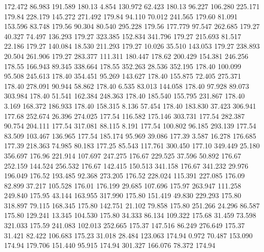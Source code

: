  172.472   86.983  191.589       180.13
   4.854  130.972   62.423       180.13
  96.227  106.280  225.171       179.84
 228.179  145.272  271.492       179.84
  94.110   70.012  241.565       179.60
  81.091  153.596   83.748       179.56
  90.304   80.540  295.228       179.56
 177.779   97.547  262.685       179.27
  40.327   74.497  136.293       179.27
 323.385  152.834  341.796       179.27
 215.693   81.517   22.186       179.27
 140.084   18.530  211.293       179.27
  10.026   35.510  143.053       179.27
 238.893   20.504  261.906       179.27
 283.377  111.311  180.447       178.62
 200.429  154.381  246.256       178.55
 166.943   89.345  338.664       178.55
 352.263   28.536  352.195       178.40
 100.099   95.508  245.613       178.40
 354.451   95.269  143.627       178.40
 155.875   72.405  275.371       178.40
 278.091   90.944   58.862       178.40
   6.535   83.013  144.058       178.40
  97.928   89.073  303.984       178.40
  51.541  162.384  248.363       178.40
 185.540  155.795  231.867       178.40
   3.169  168.372  186.933       178.40
 158.315    8.136   57.454       178.40
 183.830   37.423  306.941       177.68
 252.674   26.396  274.025       177.54
 116.582  175.146  303.731       177.54
 282.387   90.754  204.111       177.54
 317.081   88.115    8.191       177.54
 100.802   96.185  293.139       177.54
  83.509  103.467  136.965       177.54
 185.174   95.969   39.086       177.39
   3.587   16.278  176.685       177.39
 218.363   74.985   80.183       177.25
  85.543  117.761  300.450       177.10
 349.449   25.180  356.697       176.96
 221.914  107.697  247.275       176.67
 229.525   37.596   50.892       176.67
 252.159  144.524  256.532       176.67
 142.415  150.513  341.158       176.67
 341.232   29.976  196.049       176.52
 193.485   92.368  273.205       176.52
 228.024  115.391  227.085       176.09
  82.899   37.217  105.528       176.01
 176.199   29.685  107.696       175.97
 263.947  111.258  249.840       175.95
  43.144  163.955  317.990       175.80
 151.419   49.830  229.293       175.80
 318.897   79.115  168.345       175.80
 142.751   21.102   79.858       175.80
 251.266   24.296   86.587       175.80
 129.241   13.345  104.530       175.80
  34.333   86.134  109.322       175.68
  31.459   73.598  321.033       175.59
 241.083  102.013  252.665       175.37
 147.516   86.249  276.649       175.37
  31.421   82.422  106.683       175.23
  31.018   28.484  123.063       174.94
   0.972   70.487  153.090       174.94
 179.706  151.440   95.915       174.94
 301.327  166.076   78.372       174.94
